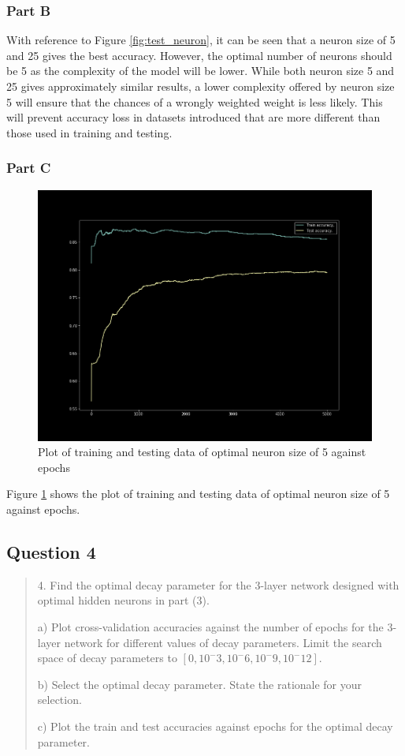 \subsubsection{Part B}
With reference to Figure \ref{fig:test_neuron}, it can be seen that a neuron size of 5 and 25 gives the best accuracy. However, the optimal number of neurons should be 5 as the complexity of the model will be lower. While both neuron size 5 and 25 gives approximately similar results, a lower complexity offered by neuron size 5 will ensure that the chances of a wrongly weighted weight is less likely. This will prevent accuracy loss in datasets introduced that are more different than those used in training and testing.

\subsubsection{Part C}

\begin{figure}[H]
    \centering
    \includegraphics[width=0.8\linewidth]{assets/plots/part1_Q3c.png}
    \caption{Plot of training and testing data of optimal neuron size of 5 against epochs}
    \label{fig:3c}
\end{figure}

Figure \ref{fig:3c} shows the plot of training and testing data of optimal neuron size of 5 against epochs.

\subsection{Question 4}
\label{1q4}
\begin{quote}

4. Find the optimal decay parameter for the 3-layer network designed with optimal hidden neurons in part (3).

a) Plot cross-validation accuracies against the number of epochs for the 3-layer network for different values of decay parameters. Limit the search space of decay parameters to $[0, 10^-3, 10^-6, 10^-9, 10^-12]$.

b) Select the optimal decay parameter. State the rationale for your selection.

c) Plot the train and test accuracies against epochs for the optimal decay parameter.
\end{quote}
